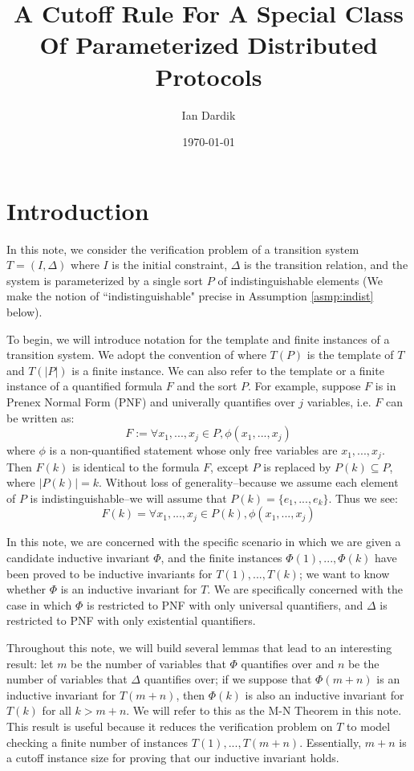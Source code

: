 \documentclass[12pt]{article}
\title{A Cutoff Rule For A Special Class Of Parameterized Distributed Protocols}
\author{Ian Dardik}
\date{\today}
\theoremstyle{definition}
\theoremstyle{remark}
\begin{document}
\maketitle

\section{Introduction}
In this note, we consider the verification problem of a transition system $T=(I,\Delta)$ where $I$ is the initial constraint, $\Delta$ is the transition relation, and the system is parameterized by a single sort $P$ of indistinguishable elements (We make the notion of ``indistinguishable" precise in Assumption \ref{asmp:indist} below).  

To begin, we will introduce notation for the template and finite instances of a transition system.  We adopt the convention of \cite{goel2021symmetry} where $T(P)$ is the template of $T$ and $T(|P|)$ is a finite instance.  We can also refer to the template or a finite instance of a quantified formula $F$ and the sort $P$.  For example, suppose $F$ is in Prenex Normal Form (PNF) and univerally quantifies over $j$ variables, i.e. $F$ can be written as:
$$F := \forall x_1,...,x_j \in P, \phi(x_1,...,x_j)$$
where $\phi$ is a non-quantified statement whose only free variables are $x_1,...,x_j$.  Then $F(k)$ is identical to the formula $F$, except $P$ is replaced by $P(k) \subseteq P$, where $|P(k)|=k$.  Without loss of generality--because we assume each element of $P$ is indistinguishable--we will assume that $P(k)=\{e_1,...,e_k\}$.  Thus we see:
$$F(k) = \forall x_1,...,x_j \in P(k), \phi(x_1,...,x_j)$$

In this note, we are concerned with the specific scenario in which we are given a candidate inductive invariant $\Phi$, and the finite instances $\Phi(1),...,\Phi(k)$ have been proved to be inductive invariants for $T(1),...,T(k)$; we want to know whether $\Phi$ is an inductive invariant for $T$.  We are specifically concerned with the case in which $\Phi$ is restricted to PNF with only universal quantifiers, and $\Delta$ is restricted to PNF with only existential quantifiers.

Throughout this note, we will build several lemmas that lead to an interesting result: let $m$ be the number of variables that $\Phi$ quantifies over and $n$ be the number of variables that $\Delta$ quantifies over; if we suppose that $\Phi(m+n)$ is an inductive invariant for $T(m+n)$, then $\Phi(k)$ is also an inductive invariant for $T(k)$ for all $k>m+n$.  We will refer to this as the M-N Theorem in this note.  This result is useful because it reduces the verification problem on $T$ to model checking a finite number of instances $T(1),...,T(m+n)$.  Essentially, $m+n$ is a cutoff instance size for proving that our inductive invariant holds.
\end{document}
